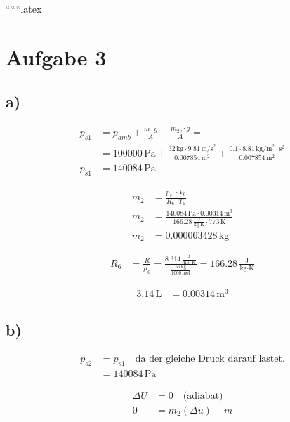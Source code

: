 
``````latex


\section*{Aufgabe 3}

\subsection*{a)}

\begin{align*}
p_{s1} &= p_{amb} + \frac{m \cdot g}{A} + \frac{m_{2v} \cdot g}{A} = \\
&= 100000 \, \text{Pa} + \frac{32 \, \text{kg} \cdot 9.81 \, \text{m/s}^2}{0.007854 \, \text{m}^2} + \frac{0.1 \cdot 8.81 \, \text{kg/m}^2 \cdot \text{s}^2}{0.007854 \, \text{m}^2} \\
p_{s1} &= 140084 \, \text{Pa}
\end{align*}

\begin{align*}
m_2 &= \frac{p_{s1} \cdot V_6}{R_6 \cdot T_6} \\
m_2 &= \frac{140084 \, \text{Pa} \cdot 0.00314 \, \text{m}^3}{166.28 \, \frac{\text{J}}{\text{kg} \cdot \text{K}} \cdot 773 \, \text{K}} \\
m_2 &= 0.000003428 \, \text{kg}
\end{align*}

\begin{align*}
R_6 &= \frac{R}{\mu_6} = \frac{8.314 \, \frac{\text{J}}{\text{mol} \cdot \text{K}}}{\frac{56 \, \text{kg}}{1000 \, \text{mol}}} = 166.28 \, \frac{\text{J}}{\text{kg} \cdot \text{K}}
\end{align*}

\begin{align*}
3.14 \, \text{L} &= 0.00314 \, \text{m}^3
\end{align*}

\subsection*{b)}

\begin{align*}
p_{s2} &= p_{s1} \quad \text{da der gleiche Druck darauf lastet.} \\
&= 140084 \, \text{Pa}
\end{align*}

\begin{align*}
\Delta U &= 0 \quad \text{(adiabat)} \\
0 &= m_2 (\Delta u) + m
\end{align*}


